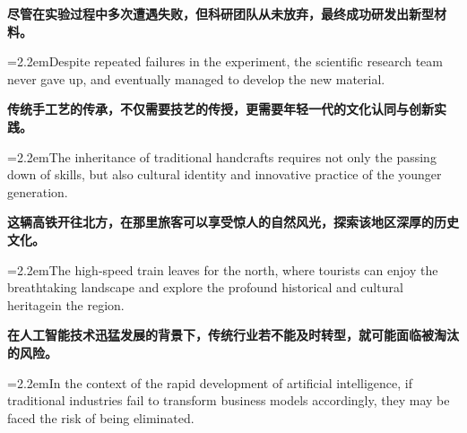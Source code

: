 \documentclass[11pt,a4paper]{article}
\newcommand{\num}[1]{\makebox[1.9em][r]{#1.}\hspace{0.3em}}
\begin{document}
\begin{minipage}{\linewidth}

\num{31}\textbf{尽管在实验过程中多次遭遇失败，但科研团队从未放弃，最终成功研发出新型材料。}

\vspace{0.15em}

\noindent\hangindent=2.2em\hspace{2.2em}Despite repeated failures in the experiment, the scientific research team never gave up, and eventually managed to develop the new material.

\end{minipage}

\begin{minipage}{\linewidth}

\num{32}\textbf{传统手工艺的传承，不仅需要技艺的传授，更需要年轻一代的文化认同与创新实践。}

\vspace{0.15em}

\noindent\hangindent=2.2em\hspace{2.2em}The inheritance of traditional handcrafts requires not only the passing down of skills, but also cultural identity and innovative practice of the younger generation.

\end{minipage}

\begin{minipage}{\linewidth}

\num{33}\textbf{这辆高铁开往北方，在那里旅客可以享受惊人的自然风光，探索该地区深厚的历史文化。}

\vspace{0.15em}

\noindent\hangindent=2.2em\hspace{2.2em}The high-speed train leaves for the north, where tourists can enjoy the breathtaking landscape and explore the profound historical and cultural heritagein the region.

\end{minipage}

\begin{minipage}{\linewidth}

\num{34}\textbf{在人工智能技术迅猛发展的背景下，传统行业若不能及时转型，就可能面临被淘汰的风险。}

\vspace{0.15em}

\noindent\hangindent=2.2em\hspace{2.2em}In the context of the rapid development of artificial intelligence, if traditional industries fail to transform business models accordingly, they may be faced the risk of being eliminated.

\end{minipage}
\end{document}
